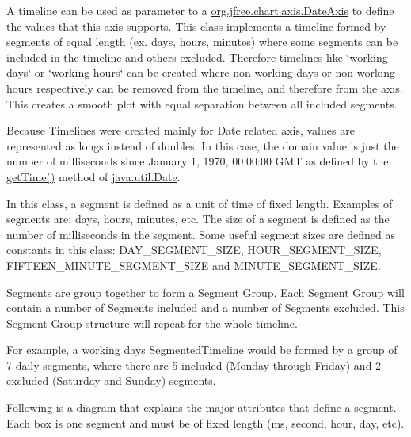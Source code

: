 A timeline can be used as parameter to a \mbox{\hyperlink{classorg_1_1jfree_1_1chart_1_1axis_1_1_date_axis}{org.\+jfree.\+chart.\+axis.\+Date\+Axis}} to define the values that this axis supports. This class implements a timeline formed by segments of equal length (ex. days, hours, minutes) where some segments can be included in the timeline and others excluded. Therefore timelines like \char`\"{}working days\char`\"{} or \char`\"{}working hours\char`\"{} can be created where non-\/working days or non-\/working hours respectively can be removed from the timeline, and therefore from the axis. This creates a smooth plot with equal separation between all included segments.

Because Timelines were created mainly for Date related axis, values are represented as longs instead of doubles. In this case, the domain value is just the number of milliseconds since January 1, 1970, 00\+:00\+:00 G\+MT as defined by the \mbox{\hyperlink{classorg_1_1jfree_1_1chart_1_1axis_1_1_segmented_timeline_aae736ac013f08ce15b1c7b4b001b297d}{get\+Time()}} method of \mbox{\hyperlink{}{java.\+util.\+Date}}.

In this class, a segment is defined as a unit of time of fixed length. Examples of segments are\+: days, hours, minutes, etc. The size of a segment is defined as the number of milliseconds in the segment. Some useful segment sizes are defined as constants in this class\+: D\+A\+Y\+\_\+\+S\+E\+G\+M\+E\+N\+T\+\_\+\+S\+I\+ZE, H\+O\+U\+R\+\_\+\+S\+E\+G\+M\+E\+N\+T\+\_\+\+S\+I\+ZE, F\+I\+F\+T\+E\+E\+N\+\_\+\+M\+I\+N\+U\+T\+E\+\_\+\+S\+E\+G\+M\+E\+N\+T\+\_\+\+S\+I\+ZE and M\+I\+N\+U\+T\+E\+\_\+\+S\+E\+G\+M\+E\+N\+T\+\_\+\+S\+I\+ZE.

Segments are group together to form a \mbox{\hyperlink{classorg_1_1jfree_1_1chart_1_1axis_1_1_segmented_timeline_1_1_segment}{Segment}} Group. Each \mbox{\hyperlink{classorg_1_1jfree_1_1chart_1_1axis_1_1_segmented_timeline_1_1_segment}{Segment}} Group will contain a number of Segments included and a number of Segments excluded. This \mbox{\hyperlink{classorg_1_1jfree_1_1chart_1_1axis_1_1_segmented_timeline_1_1_segment}{Segment}} Group structure will repeat for the whole timeline.

For example, a working days \mbox{\hyperlink{classorg_1_1jfree_1_1chart_1_1axis_1_1_segmented_timeline}{Segmented\+Timeline}} would be formed by a group of 7 daily segments, where there are 5 included (Monday through Friday) and 2 excluded (Saturday and Sunday) segments.

Following is a diagram that explains the major attributes that define a segment. Each box is one segment and must be of fixed length (ms, second, hour, day, etc).


